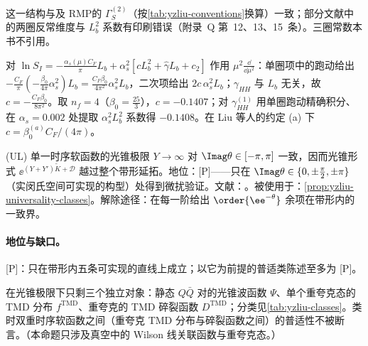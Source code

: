 这一结构与\cite[式~(A.6)]{Ji:2023pba}及 RMP\cite{JiEtAl2021}的 $\Gamma_S^{(2)}$（按\cref{tab:yzliu-conventions}换算）一致；部分文献中的两圈反常维度与 $L_b^2$ 系数有印刷错误（附录~Q 第~12、13、15~条）。三圈常数本书不引用。

\begin{example}\label{ex:yzliu-sI-rge}
对 $\ln S_I=-\frac{\alpha_s(\mu)C_F}{\pi}L_b+\alpha_s^2[cL_b^2+\hat\gamma L_b+c_2]$ 作用 $\mu^2\frac{\dd}{\dd\mu^2}$：单圈项中的跑动给出 $-\frac{C_F}{\pi}(-\frac{\beta_0}{4\pi}\alpha_s^2)L_b=\frac{C_F\beta_0}{4\pi^2}\alpha_s^2L_b$，二次项给出 $2c\,\alpha_s^2L_b$；$\gamma_{HH}$ 与 $L_b$ 无关，故 $c=-\frac{C_F\beta_0}{8\pi^2}$。取 $n_f=4$（$\beta_0=\frac{25}{3}$），$c=-0.1407$；对 $\gamma^{(1)}_{HH}$ 用单圈跑动精确积分、在 $\alpha_s=0.002$ 处提取 $\alpha_s^2L_b^2$ 系数得 $-0.1408$。在 Liu 等人的约定 (a) 下 $c=\beta_0^{(a)}C_F/(4\pi)$。
\end{example}

\begin{assumption}\label{asm:yzliu-lightcone-uniform}
(UL) 单一时序软函数的光锥极限 $Y\to\infty$ 对 $\Imag\theta\in[-\pi,\pi]$ 一致，因而光锥形式 $\ee^{(Y+Y')\tilde K+\mathcal D}$ 越过整个带形延拓。地位：[P]——只在 $\Imag\theta\in\{0,\pm\frac\pi2,\pm\pi\}$（实闵氏空间可实现的构型）处得到微扰验证。文献：\cite[第~4.5--4.7~节、第~6~节]{Liu:2022nnk}。被使用于：\cref{prop:yzliu-universality-classes}。解除途径：在每一阶给出 $\order{\ee^{-\theta}}$ 余项在带形内的一致界。
\end{assumption}

\paragraph{地位与缺口。}[P]：只在带形内五条可实现的直线上成立；以它为前提的普适类陈述至多为 [P]。

\begin{proposition}\label{prop:yzliu-universality-classes}
在光锥极限下只剩三个独立对象：静态 $Q\bar Q$ 对的光锥波函数 $\Psi$、单个重夸克态的 TMD 分布 $f^{\mathrm{TMD}}$、重夸克的 TMD 碎裂函数 $D^{\mathrm{TMD}}$；分类见\cref{tab:yzliu-classes}。类时双重时序软函数之间（重夸克 TMD 分布与碎裂函数之间）的普适性不被断言。（本命题只涉及真空中的 Wilson 线关联函数与重夸克态。）
\end{proposition}

